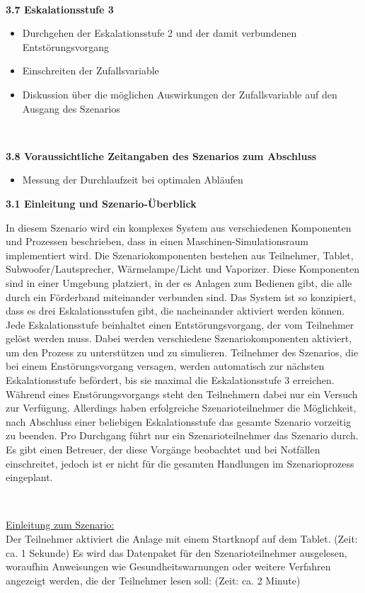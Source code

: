  \

\textbf{3.7 Eskalationsstufe 3}
\begin{itemize}
\item
Durchgehen der Eskalationsstufe 2 und der damit verbundenen Entstörungsvorgang
\item
Einschreiten der Zufallsvariable
\item
Diskussion über die möglichen Auswirkungen der Zufallsvariable auf den Ausgang des Szenarios
\end{itemize}

\

\textbf{3.8 Voraussichtliche Zeitangaben des Szenarios zum Abschluss}
\begin{itemize}
\item
Messung der Durchlaufzeit bei optimalen Abläufen
\end{itemize}

\newpage

\textbf{3.1 Einleitung und Szenario-Überblick}

In diesem Szenario wird ein komplexes System aus verschiedenen Komponenten und Prozessen beschrieben, dass in einen Maschinen-Simulationsraum implementiert wird. Die Szenariokomponenten bestehen aus Teilnehmer, Tablet, Subwoofer/Lautsprecher, Wärmelampe/Licht und Vaporizer. Diese Komponenten sind in einer Umgebung platziert, in der es Anlagen zum Bedienen gibt, die alle durch ein Förderband miteinander verbunden sind. Das System ist so konzipiert, dass es drei Eskalationsstufen gibt, die nacheinander aktiviert werden können. Jede Eskalationsstufe beinhaltet einen Entstörungsvorgang, der vom Teilnehmer gelöst werden muss. Dabei werden verschiedene Szenariokomponenten aktiviert, um den Prozess zu unterstützen und zu simulieren. Teilnehmer des Szenarios, die bei einem Enstörungsvorgang versagen, werden automatisch zur nächsten Eskalationsstufe befördert, bis sie maximal die Eskalationsstufe 3 erreichen. Während eines Enstörungsvorgangs steht den Teilnehmern dabei nur ein Versuch zur Verfügung. Allerdings haben erfolgreiche Szenarioteilnehmer die Möglichkeit, nach Abschluss einer beliebigen Eskalationsstufe das gesamte Szenario vorzeitig zu beenden. Pro Durchgang führt nur ein Szenarioteilnehmer das Szenario durch. Es gibt einen Betreuer, der diese Vorgänge beobachtet und bei Notfällen einschreitet, jedoch ist er nicht für die gesamten Handlungen im Szenarioprozess eingeplant.

\

\underline{Einleitung zum Szenario:} \\
Der Teilnehmer aktiviert die Anlage mit einem Startknopf auf dem Tablet. (Zeit: ca. 1 Sekunde)
Es wird das Datenpaket für den Szenarioteilnehmer ausgelesen, woraufhin Anweisungen wie Gesundheitswarnungen oder weitere Verfahren angezeigt werden, die der Teilnehmer lesen soll: (Zeit: ca. 2 Minute)

